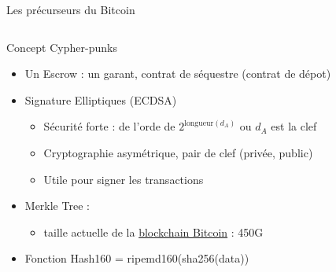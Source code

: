 \documentclass[presentation]{beamer}
\begin{document}
\begin{frame}[label={sec:orgb23d075}]{Les précurseurs du Bitcoin}
\begin{columns}
\begin{column}{0.4\columnwidth}
\begin{block}
{}
\end{block}
\end{column}
\end{columns}
\end{frame}





\begin{frame}[label={sec:org504f219}]{Concept Cypher-punks}
\begin{itemize}
\item <1-> Un Escrow :  un garant, \alert{contrat de séquestre} (contrat de dépot)
\item <2-> Signature Elliptiques (ECDSA)
\begin{itemize}
\item Sécurité forte : de l'orde de \(2^{\text{longueur}(d_A)}\) ou \(d_A\) est la clef
\item Cryptographie asymétrique,  pair de clef (privée, public)
\item Utile pour signer les transactions
\end{itemize}
\item <3-> Merkle Tree :
\begin{itemize}
\item taille actuelle de la \href{https://ycharts.com/indicators/bitcoin\_blockchain\_size}{blockchain Bitcoin} : 450G
\end{itemize}
\item <4-> Fonction Hash160 = ripemd160(sha256(data))
\end{itemize}
\end{frame}
\end{document}
